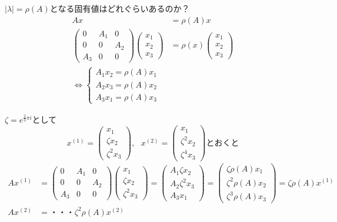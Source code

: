 $|\lambda| = \rho(A)$となる固有値はどれぐらいあるのか？
\begin{align*}
  Ax&=\rho (A)x\\
  \begin{pmatrix}
    0&A_1 &0\\
    0&0&A_2\\
    A_3 &0&0
  \end{pmatrix}
  \begin{pmatrix}
    x_1\\
    x_2\\
    x_3
  \end{pmatrix}
  &=\rho (x)
  \begin{pmatrix}
    x_1\\
    x_2\\
    x_3
  \end{pmatrix}\\
  \Leftrightarrow
  \begin{cases}
    A_1 x_2 =\rho (A)x_1\\
    A_2 x_3 =\rho (A)x_2\\
    A_3 x_1 =\rho (A)x_3
  \end{cases}
\end{align*}

$\zeta = e^{\frac{2}{3}\pi i}$として
\begin{equation*}
  x^{(1)}=
  \begin{pmatrix}
    x_1 \\
    \zeta x_2\\
    {\zeta}^2 x_3
  \end{pmatrix},\ \ \
  x^{(2)}=
  \begin{pmatrix}
    x_1\\
    {\zeta}^2 x_2\\
    {\zeta}^4 x_3
  \end{pmatrix}とおくと
\end{equation*}
\begin{align}
  Ax^{(1)}&=
  \begin{pmatrix}
    0&A_1 &0\\
    0&0&A_2\\
    A_3 &0&0
  \end{pmatrix}
  \begin{pmatrix}
    x_1\\
    \zeta x_2\\
    {\zeta}^2 x_3
  \end{pmatrix}=
  \begin{pmatrix}
    A_1 \zeta x_2\\
    A_2 {\zeta}^2 x_3\\
    A_3 x_1
  \end{pmatrix}=
  \begin{pmatrix}
    \zeta \rho (A)x_1\\
    {\zeta}^2 \rho (A)x_2\\
    {\zeta}^3 \rho (A)x_3
  \end{pmatrix}=\zeta \rho (A)x^{(1)}\\
  Ax^{(2)}&=・・・{\zeta}^2 \rho (A)x^{(2)}
\end{align}

